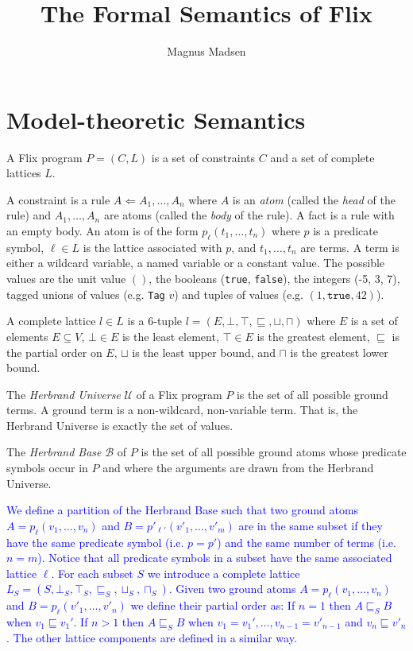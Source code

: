 \documentclass[10pt,twocolumn]{article}
\title{The Formal Semantics of Flix}
\author{Magnus Madsen}
\date{}
\begin{document}
\maketitle

\section{Model-theoretic Semantics}

A Flix program $P = (C, L)$ is a set of constraints $C$ and a set of complete lattices $L$.

A constraint is a rule $A \Leftarrow A_1, \dots, A_n$ 
where $A$ is an \emph{atom} (called the \emph{head} of the rule) 
and $A_1, \dots, A_n$ are atoms (called the \emph{body} of the rule).
A fact is a rule with an empty body.
An atom is of the form $p_\ell(t_1, \dots, t_n)$ where 
$p$ is a predicate symbol,
$\ell \in L$ is the lattice associated with $p$, and
$t_1, \dots, t_n$ are terms. 
A term is either a wildcard variable, a named variable or a constant value. 
The possible values are the unit value $()$, the booleans (\texttt{true}, \texttt{false}),
the integers (-5, 3, 7), tagged unions of values (e.g. \texttt{Tag} $v$) and 
tuples of values (e.g. $(1, \texttt{true}, 42)$).

A complete lattice $l \in L$ is a 6-tuple $l = (E, \bot, \top, \sqsubseteq, \sqcup, \sqcap)$ where 
$E$ is a set of elements $E \subseteq V$,
$\bot \in E$ is the least element,
$\top \in E$ is the greatest element,
$\sqsubseteq$ is the partial order on $E$,
$\sqcup$ is the least upper bound, and
$\sqcap$ is the greatest lower bound.

The \emph{Herbrand Universe} $\mathcal{U}$ of a Flix program $P$ is the set of all possible ground terms.
A ground term is a non-wildcard, non-variable term. That is, the Herbrand Universe is exactly the set of values.

The \emph{Herbrand Base} $\mathcal{B}$ of $P$ is the set of all possible ground atoms whose
predicate symbols occur in $P$ and where the arguments are drawn from the Herbrand Universe.

\textcolor{blue}{
We define a partition of the Herbrand Base such that two ground atoms 
$A = p_\ell(v_1, \dots, v_n)$ and $B = p'_{\ell'}(v'_1, \dots, v'_m)$ are in the same subset
if they have the same predicate symbol (i.e. $p = p'$) and the same number of terms (i.e. $n = m$).
Notice that all predicate symbols in a subset have the same associated lattice $\ell$.
For each subset $S$ we introduce a complete lattice $L_S = (S, \bot_S, \top_S, \sqsubseteq_S, \sqcup_S, \sqcap_S)$.
Given two ground atoms $A = p_\ell(v_1, \dots, v_n)$ and $B = p_\ell(v'_1, \dots, v'_n)$ we define their partial order as:
If $n = 1$ then $A \sqsubseteq_S B$ when $v_1 \sqsubseteq v_1'$.
If $n > 1$ then $A \sqsubseteq_S B$ when $v_1 = v_1', \dots, v_{n - 1} = v'_{n - 1}$ and $v_n \sqsubseteq v'_n$.
The other lattice components are defined in a similar way.
}
\end{document}
